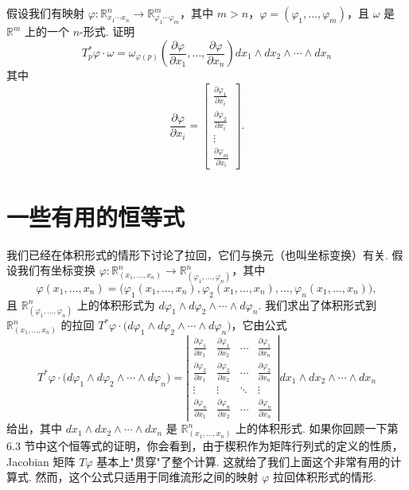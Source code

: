 \begin{question}\label{q:6-17}
假设我们有映射 $\varphi:\mathbb{R}^n_{x_1\cdots x_n}\to\mathbb{R}^m_{\varphi_1\cdots\varphi_m}$，其中 $m>n$，$\varphi=(\varphi_1,\ldots,\varphi_m)$，且 $\omega$ 是 $\mathbb{R}^m$ 上的一个 $n$-形式. 证明
\[
T_p^*\varphi\cdot\omega=\omega_{\varphi(p)}\left(\frac{\partial\varphi}{\partial x_1},\ldots,\frac{\partial\varphi}{\partial x_n}\right)dx_1\wedge dx_2\wedge\cdots\wedge dx_n
\]
其中
\[
\frac{\partial\varphi}{\partial x_i}=
\begin{bmatrix}
\frac{\partial\varphi_1}{\partial x_i}\\
\frac{\partial\varphi_2}{\partial x_i}\\
\vdots\\
\frac{\partial\varphi_m}{\partial x_i}
\end{bmatrix}.
\]
\end{question}

\section{一些有用的恒等式}

我们已经在体积形式的情形下讨论了拉回，它们与换元（也叫坐标变换）有关. 假设我们有坐标变换 $\varphi:\mathbb{R}^n_{(x_1,\ldots,x_n)}\to\mathbb{R}^n_{(\varphi_1,\ldots,\varphi_n)}$，其中
\[
\varphi(x_1,\ldots,x_n)=\bigl(\varphi_1(x_1,\ldots,x_n),\varphi_2(x_1,\ldots,x_n),\ldots,\varphi_n(x_1,\ldots,x_n)\bigr),
\]
且 $\mathbb{R}^n_{(\varphi_1,\ldots,\varphi_n)}$ 上的体积形式为 $d\varphi_1\wedge d\varphi_2\wedge\cdots\wedge d\varphi_n$. 我们求出了体积形式到 $\mathbb{R}^n_{(x_1,\ldots,x_n)}$ 的拉回 $T^*\varphi\cdot\bigl(d\varphi_1\wedge d\varphi_2\wedge\cdots\wedge d\varphi_n\bigr)$，它由公式
\[
T^*\varphi\cdot\bigl(d\varphi_1\wedge d\varphi_2\wedge\cdots\wedge d\varphi_n\bigr)
=\left|\begin{matrix}
\frac{\partial\varphi_1}{\partial x_1}&\frac{\partial\varphi_1}{\partial x_2}&\cdots&\frac{\partial\varphi_1}{\partial x_n}\\
\frac{\partial\varphi_2}{\partial x_1}&\frac{\partial\varphi_2}{\partial x_2}&\cdots&\frac{\partial\varphi_2}{\partial x_n}\\
\vdots&\vdots&\ddots&\vdots\\
\frac{\partial\varphi_n}{\partial x_1}&\frac{\partial\varphi_n}{\partial x_2}&\cdots&\frac{\partial\varphi_n}{\partial x_n}
\end{matrix}\right|dx_1\wedge dx_2\wedge\cdots\wedge dx_n
\]
给出，其中 $dx_1\wedge dx_2\wedge\cdots\wedge dx_n$ 是 $\mathbb{R}^n_{(x_1,\ldots,x_n)}$ 上的体积形式. 如果你回顾一下第 6.3 节中这个恒等式的证明，你会看到，由于楔积作为矩阵行列式的定义的性质，Jacobian 矩阵 $T\varphi$ 基本上"贯穿"了整个计算. 这就给了我们上面这个非常有用的计算式. 然而，这个公式只适用于同维流形之间的映射 $\varphi$ 拉回体积形式的情形.

